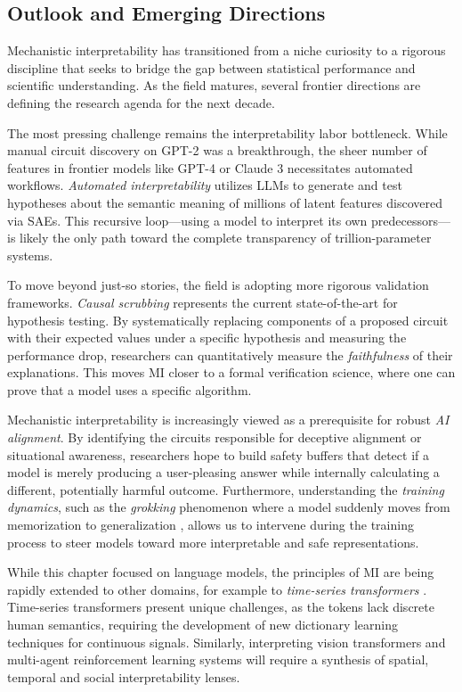 \subsection{Outlook and Emerging Directions}

Mechanistic interpretability has transitioned from a niche curiosity to a rigorous discipline that seeks to bridge the gap between statistical performance and scientific understanding. As the field matures, several frontier directions are defining the research agenda for the next decade.

The most pressing challenge remains the interpretability labor bottleneck. While manual circuit discovery on GPT-2 was a breakthrough, the sheer number of features in frontier models like GPT-4 or Claude 3 necessitates automated workflows. \emph{Automated interpretability} \citep{bills2023language} utilizes LLMs to generate and test hypotheses about the semantic meaning of millions of latent features discovered via SAEs. This recursive loop---using a model to interpret its own predecessors---is likely the only path toward the complete transparency of trillion-parameter systems.

To move beyond just-so stories, the field is adopting more rigorous validation frameworks. \emph{Causal scrubbing} \citep{chan2022causal} represents the current state-of-the-art for hypothesis testing. By systematically replacing components of a proposed circuit with their expected values under a specific hypothesis and measuring the performance drop, researchers can quantitatively measure the \emph{faithfulness} of their explanations. This moves MI closer to a formal verification science, where one can prove that a model uses a specific algorithm.

Mechanistic interpretability is increasingly viewed as a prerequisite for robust \emph{AI alignment}. By identifying the circuits responsible for deceptive alignment or situational awareness, researchers hope to build safety buffers that detect if a model is merely producing a user-pleasing answer while internally calculating a different, potentially harmful outcome. Furthermore, understanding the \emph{training dynamics}, such as the \emph{grokking} phenomenon where a model suddenly moves from memorization to generalization \citep{nanda2023progress}, allows us to intervene during the training process to steer models toward more interpretable and safe representations.

While this chapter focused on language models, the principles of MI are being rapidly extended to other domains, for example to \emph{time-series transformers} \citep{kalnare2026}. Time-series transformers present unique challenges, as the tokens lack discrete human semantics, requiring the development of new dictionary learning techniques for continuous signals. Similarly, interpreting vision transformers and multi-agent reinforcement learning systems will require a synthesis of spatial, temporal and social interpretability lenses.


